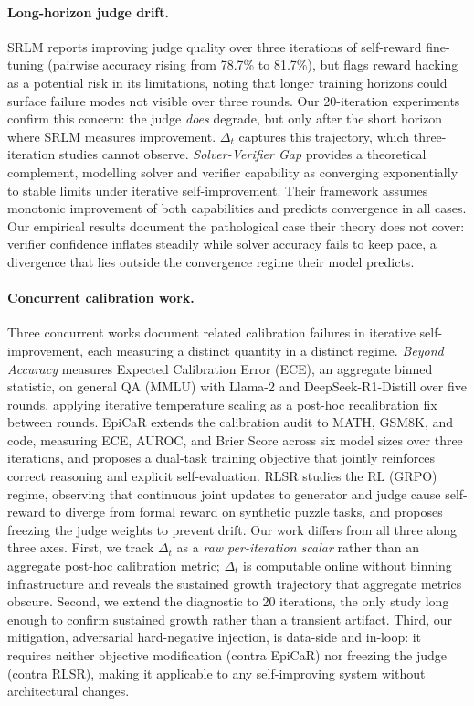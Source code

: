 \documentclass{article}
\begin{document}
\paragraph{Long-horizon judge drift.}
SRLM \citep{yuan2024self} reports improving judge quality over three iterations of
self-reward fine-tuning (pairwise accuracy rising from 78.7\% to 81.7\%), but flags
reward hacking as a potential risk in its limitations, noting that longer training
horizons could surface failure modes not visible over three rounds.
Our 20-iteration experiments confirm this concern: the judge \emph{does} degrade,
but only after the short horizon where SRLM measures improvement.
$\Delta_t$ captures this trajectory, which three-iteration studies cannot observe.
\emph{Solver-Verifier Gap} \citep{sun2025solververifier} provides a theoretical
complement, modelling solver and verifier capability as converging exponentially to
stable limits under iterative self-improvement.
Their framework assumes monotonic improvement of both capabilities and predicts
convergence in all cases.
Our empirical results document the pathological case their theory does not cover:
verifier confidence inflates steadily while solver accuracy fails to keep pace,
a divergence that lies outside the convergence regime their model predicts.

\paragraph{Concurrent calibration work.}
Three concurrent works document related calibration failures in iterative
self-improvement, each measuring a distinct quantity in a distinct regime.
\emph{Beyond Accuracy} \citep{huang2025beyondaccuracy} measures Expected Calibration Error (ECE),
an aggregate binned statistic, on general QA (MMLU) with
Llama-2 and DeepSeek-R1-Distill over five rounds, applying iterative temperature
scaling as a post-hoc recalibration fix between rounds.
EpiCaR \citep{epicar2026} extends the calibration audit to MATH, GSM8K, and code,
measuring ECE, AUROC, and Brier Score across six model sizes over three iterations, and
proposes a dual-task training objective that jointly reinforces correct reasoning and
explicit self-evaluation.
RLSR \citep{rlsr2025} studies the RL (GRPO) regime, observing that continuous joint
updates to generator and judge cause self-reward to diverge from formal reward on
synthetic puzzle tasks, and proposes freezing the judge weights to prevent drift.
Our work differs from all three along three axes.
First, we track $\Delta_t$ as a \emph{raw per-iteration scalar} rather than an aggregate
post-hoc calibration metric; $\Delta_t$ is computable online without binning
infrastructure and reveals the sustained growth trajectory that aggregate metrics
obscure.
Second, we extend the diagnostic to 20 iterations, the only study long enough to
confirm sustained growth rather than a transient artifact.
Third, our mitigation, adversarial hard-negative injection, is data-side and in-loop:
it requires neither objective modification (contra EpiCaR) nor freezing the judge
(contra RLSR), making it applicable to any self-improving system without architectural
changes.
\end{document}
